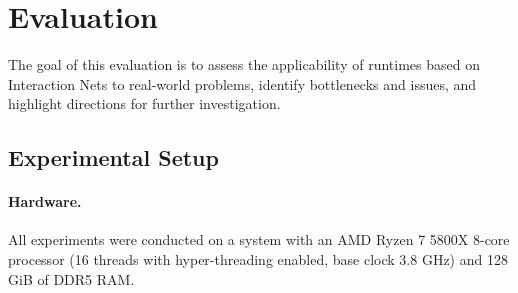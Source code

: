 \section{Evaluation}\label{sec:evaluation}

The goal of this evaluation is to assess the applicability of runtimes based on Interaction Nets to real-world problems, identify bottlenecks and issues, and highlight directions for further investigation.

\subsection{Experimental Setup}

\paragraph{Hardware.}
All experiments were conducted on a system with an AMD Ryzen 7 5800X 8-core processor (16 threads with hyper-threading enabled, base clock 3.8 GHz) and 128 GiB of DDR5 RAM.

